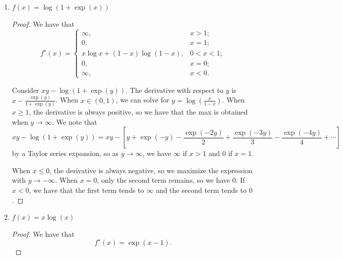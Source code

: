 \documentclass[11pt]{amsart}
\begin{document}
\begin{enumerate}
\begin{enumerate}
\begin{proof}
    To see this, we can maximize
    $\left\langle x, y \right\rangle - \exp\left(y\right)$ with respect to $y$
    by taking the derivative, setting it to $0$, and solving for $y$. In doing
    so, we find that $y = \log x$, which is only defined when $x > 0$. When
    $x \leq 0$, we see that we can maximize $xy - \exp\left(y\right)$ by sending
    $y$ to $-\infty$.
  \end{proof}
\item $f(x) =  \log(1+\exp(x))$
  \begin{proof}
    We have that
    \begin{equation*}
      \boxed{f^\star(x) =
        \begin{cases}
          \infty, &x > 1; \\
          0, &x = 1; \\
          x\log x + \left(1 - x\right)\log\left(1 - x\right), & 0 < x < 1; \\
          0, & x = 0; \\
          \infty, &x < 0.
        \end{cases}}
    \end{equation*}

    Consider $xy - \log(1+\exp(y))$. The derivative with respect to $y$ is
    $x - \frac{\exp(y)}{1+\exp(y)}$. When $x \in \left(0, 1\right)$, we can
    solve for $y = \log\left(\frac{x}{1 - x}\right)$. When $x \geq 1$, the
    derivative is always positive, so we have that the max is obtained when
    $y \rightarrow \infty$. We note that
    \begin{equation*}
      xy - \log(1+\exp(y)) = xy - \left[
        y + \exp(-y) - \frac{\exp(-2y)}{2} + \frac{\exp(-3y)}{3} - \frac{\exp(-4y)}{4} + \cdots
      \right]
    \end{equation*}
    by a Taylor series expansion, so as $y \rightarrow \infty$, we have $\infty$
    if $x > 1$ and $0$ if $x = 1$.

    When $x \leq 0$, the derivative is always negative, so we maximize the
    expression with $y \rightarrow -\infty$. When $x = 0$, only the second term
    remains, so we have $0$. If $x < 0$, we have that the first term tends to
    $\infty$ and the second term tends to $0$.
  \end{proof}
\item $f(x) = x\log(x)$
  \begin{proof}
    We have that
    \begin{equation*}
      \boxed{f^\star(x) = \exp\left(x - 1\right).}
    \end{equation*}


\end{proof}
\end{enumerate}
\end{enumerate}
\end{document}
